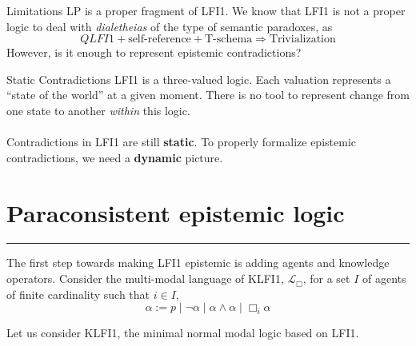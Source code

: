 \documentclass[aspectratio=169,11pt]{beamer}
\newcommand{\sectiondivider}[1][Violet]{%
  \begin{frame}[c]
    \centering
    {\color{Rose}\large\thesection\par}
    \vspace{.35cm}
    {\color{#1}\LARGE\insertsectionhead\par}
    \vspace{.4cm}
    {\color{Gold}\rule{3cm}{.5pt}\par}
  \end{frame}}
\begin{document}
\begin{frame}{Limitations}
    LP is a proper fragment of LFI1. We know that LFI1 is not a proper logic to deal with \textit{dialetheias} of the type of semantic paradoxes, as
    \[QLFI1 + \text{self-reference} + \text{T-schema} \Rightarrow \text{Trivialization}\]
    However, is it enough to represent epistemic contradictions?

    
\centering
\end{frame}

\begin{frame}{Static Contradictions}
    LFI1 is a three-valued logic. Each valuation represents a ``state of the world'' at a given moment. There is no tool to represent change from one state to another \textit{within} this logic.\\~\\
    Contradictions in LFI1 are still \textbf{static}. To properly formalize epistemic contradictions, we need a \textbf{dynamic} picture.

    
\end{frame}

\section[Paraconsistent Epistemic Logic]{Paraconsistent epistemic logic}
\sectiondivider

\begin{frame}
The first step towards making LFI1 epistemic is adding agents and knowledge operators. Consider the multi-modal language of KLFI1, $\mathcal{L}_\Box$, for a set $I$ of agents of finite cardinality such that $i \in I$, 
\[\alpha := p \mid \neg\alpha \mid \alpha \land \alpha \mid \Box_i\alpha\]

Let us consider KLFI1, the minimal normal modal logic based on LFI1.
\end{frame}
\end{document}
